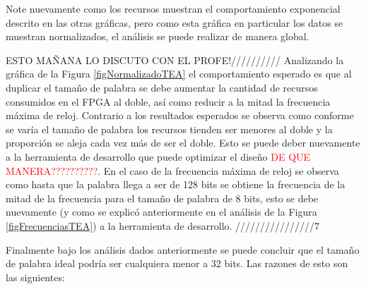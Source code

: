 	
Note nuevamente como los recursos muestran el comportamiento exponencial descrito en las otras gráficas, pero como esta gráfica en particular los datos se muestran normalizados, el análisis se puede realizar de manera global.

ESTO MAÑANA LO DISCUTO CON EL PROFE!//////////
Analizando la gráfica de la Figura \ref{figNormalizadoTEA} el comportamiento esperado es que al duplicar el tamaño de palabra se debe aumentar la cantidad de recursos consumidos en el FPGA al doble, así como reducir a la mitad la frecuencia máxima de reloj. Contrario a los resultados esperados se observa como conforme se varía el tamaño de palabra los recursos tienden ser menores al doble y la proporción se aleja cada vez más de ser el doble. Esto se puede deber nuevamente a la herramienta de desarrollo que puede optimizar el diseño \textcolor{red}{DE QUE MANERA??????????}. En el caso de la frecuencia máxima de reloj se observa como hasta que la palabra llega a ser de 128 bits se obtiene la frecuencia de la mitad de la frecuencia para el tamaño de palabra de 8 bits, esto se debe nuevamente (y como se explicó anteriormente en el análisis de la Figura \ref{figFrecuenciasTEA}) a la herramienta de desarrollo.
////////////////7

Finalmente bajo los análisis dados anteriormente se puede concluir que el tamaño de palabra ideal podría ser cualquiera menor a 32 bits. Las razones de esto son las siguientes:


